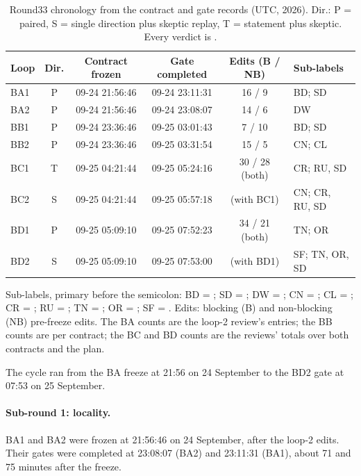 \begin{table}[htbp]
\centering\small
\caption{Round33 chronology from the contract and gate records (UTC, 2026).
Dir.: P = paired, S = single direction plus skeptic replay, T = statement plus
skeptic. Every verdict is .}
\label{tab:history-chronology}
\begin{tabular}{@{}lccccl@{}}
\toprule
Loop & Dir. & Contract frozen & Gate completed & Edits (B / NB) & Sub-labels\\
\midrule
BA1 & P & 09-24 21:56:46 & 09-24 23:11:31 & 16 / 9 & BD; SD\\
BA2 & P & 09-24 21:56:46 & 09-24 23:08:07 & 14 / 6 & DW\\
BB1 & P & 09-24 23:36:46 & 09-25 03:01:43 & 7 / 10 & BD; SD\\
BB2 & P & 09-24 23:36:46 & 09-25 03:31:54 & 15 / 5 & CN; CL\\
BC1 & T & 09-25 04:21:44 & 09-25 05:24:16 & 30 / 28 (both) & CR; RU, SD\\
BC2 & S & 09-25 04:21:44 & 09-25 05:57:18 & (with BC1) & CN; CR, RU, SD\\
BD1 & P & 09-25 05:09:10 & 09-25 07:52:23 & 34 / 21 (both) & TN; OR\\
BD2 & S & 09-25 05:09:10 & 09-25 07:53:00 & (with BD1) & SF; TN, OR, SD\\
\bottomrule
\end{tabular}

\smallskip
\begin{minipage}{0.94\linewidth}\footnotesize\raggedright
Sub-labels, primary before the semicolon: BD = ;
SD = ; DW = ;
CN = ;
CL = ;
CR = ;
RU = ;
TN = ; OR = ;
SF = . Edits: blocking (B) and
non-blocking (NB) pre-freeze edits. The BA counts are the loop-2
review's entries; the BB counts are per contract; the BC and BD counts are
the reviews' totals over both contracts and the plan.
\end{minipage}
\end{table}

The cycle ran from the BA freeze at 21:56 on 24 September to the BD2 gate at
07:53 on 25 September.

\paragraph{Sub-round 1: locality.} BA1 and BA2 were frozen at 21:56:46 on 24
September, after the loop-2 edits. Their gates were completed at 23:08:07
(BA2) and 23:11:31 (BA1), about 71 and 75 minutes after the freeze.

